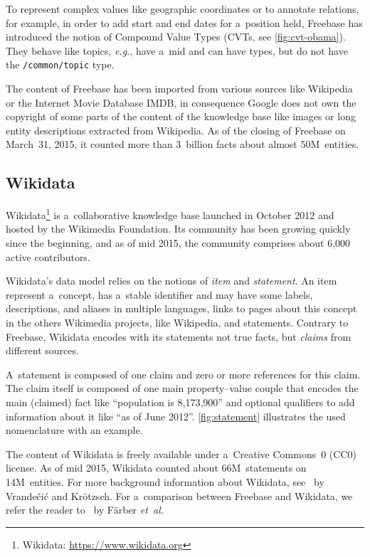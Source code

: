 \documentclass{sig-alternate}
\begin{document}
To represent complex values like geographic coordinates or to annotate relations,
for example, in order to add start and end dates for a~position held,
Freebase has introduced the notion of Compound Value Types (CVTs, see \autoref{fig:cvt-obama}).
They behave like topics, \emph{e.g.}, have a~mid and can have types,
but do not have the \texttt{/common/topic} type.

The content of Freebase has been imported from various sources like Wikipedia
or the Internet Movie Database IMDB,
in consequence Google does not own the copyright of some parts of the content of the knowledge base
like images or long entity descriptions extracted from Wikipedia.
As of the closing of Freebase on March~31, 2015,
it counted more than 3~billion facts about almost 50M~entities.

\subsection{Wikidata}

Wikidata\footnote{Wikidata: \url{https://www.wikidata.org}}
is a~collaborative knowledge base
launched in October 2012 and hosted by the Wikimedia Foundation.
Its community has been growing quickly since the beginning, and as of mid 2015,
the community comprises about 6,000 active contributors.

Wikidata's data model relies on the notions of \emph{item} and \emph{statement}.
An item represent a~concept, has a~stable identifier and may have some labels,
descriptions, and aliases in multiple languages, links to pages about this concept
in the others Wikimedia projects, like Wikipedia, and statements.
Contrary to Freebase, Wikidata encodes with its statements not true facts,
but \emph{claims} from different sources.

A~statement is composed of one claim and zero or more references for this claim.
The claim itself is composed of one main property--value couple that encodes
the main (claimed) fact like ``population is 8,173,900'' and optional qualifiers
to add information about it like ``as of June 2012''.
\autoref{fig:statement} illustrates the used nomenclature with an example.

The content of Wikidata is freely available under a~Creative Commons~0 (CC0) license.
As of mid 2015, Wikidata counted about 66M~statements on 14M~entities.
For more background information about Wikidata, see~\cite{vrandevcic2014wikidata}
by Vrandečić and Krötzsch.
For a~comparison between Freebase and Wikidata,
we refer the reader to~\cite{farbercomparative} by Färber \emph{et~al.}
\end{document}
